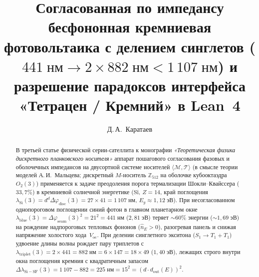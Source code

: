 \documentclass[11pt,a4paper]{article}
\title{\textbf{Согласованная по импедансу бесфононная кремниевая фотовольтаика с делением синглетов ($441\;\text{нм}\to 2\times 882\;\text{нм} < 1\,107\;\text{нм}$) и разрешение парадоксов интерфейса «Тетрацен / Кремний» в Lean~4}}
\author{Д.\,А.~Каратаев}
\date{}
\theoremstyle{plain}
\theoremstyle{definition}
\begin{document}
\maketitle

\begin{abstract}
В третьей статье физической серии-сателлита к монографии \emph{«Теоретическая физика дискретного планковского носителя»} аппарат пошагового согласования фазовых и оболочечных импедансов на двусортной системе носителей $\langle\mathcal{M},\mathcal{T}\rangle$ (в смысле теории моделей А.\,И.~Мальцева; дискретный $M$-носитель $\mathbb{Z}_{512}$ на оболочке кубооктаэдра $O_2(3)$) применяется к задаче преодоления порога термализации Шокли--Квайссера ($33{,}7\%$) в кремниевой солнечной энергетике ($\mathrm{Si}$, $Z=14$, край поглощения $\lambda_{\mathrm{Si}}(3) = d^d\Delta\varphi_{\mathrm{disc}}(3) = 27\times 41 = 1\,107\;\text{нм}$, $E_g\approx 1{,}12\;\text{эВ}$). При несогласованном однопороговом поглощении синий фотон в главном планетарном окне $\lambda_{\mathrm{blue}}(3) = \Delta\varphi_{\mathrm{seam}}(3)^2 = 21^2 = 441\;\text{нм}$ ($2{,}81\;\text{эВ}$) теряет $\sim 60\%$ энергии ($\sim 1{,}69\;\text{эВ}$) на рождение надпороговых тепловых фононов ($\hat{n}_E > 0$), разогревая панель и снижая напряжение холостого хода~$V_{\mathrm{oc}}$. При делении синглетного экситона ($S_1\to T_1 + T_1$) удвоение длины волны рождает пару триплетов с $\lambda_{\mathrm{triplet}}(3) = 2\times 441 = 882\;\text{нм} = 6\times 147 = 18\times 49$ ($1{,}40\;\text{эВ}$), лежащих строго внутри окна поглощения кремния с квадратичным запасом $\Delta\lambda_{\mathrm{Si-SF}}(3) = 1\,107 - 882 = 225\;\text{нм} = 15^2 = (d\cdot d_{\mathrm{out}}(E))^2$.


\end{abstract}
\end{document}

